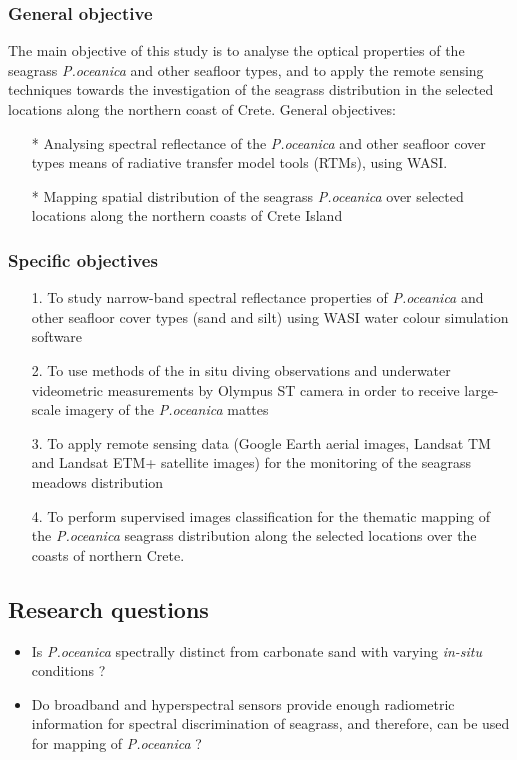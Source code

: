\documentclass[11pt]{article}
\begin{document}
\subsubsection{General objective}
The main objective of this study is to analyse the optical properties of the seagrass \textit{P.oceanica} and other seafloor types, and to apply the remote sensing techniques towards the investigation of the seagrass distribution in the selected locations along the northern coast of Crete.
General objectives:
	\begin{itemize}
		\item[*]Analysing spectral reflectance of the \textit{P.oceanica} and other seafloor cover types means of radiative transfer model tools (\ac{RTM}s), using \ac{WASI}.
		\item[*]Mapping spatial distribution of the seagrass \textit{P.oceanica} over selected locations along the northern coasts of Crete Island 
	\end{itemize}

\subsubsection{Specific objectives}
	\begin{itemize}	
		\item[]1.	To study narrow-band spectral reflectance properties of \textit{P.oceanica} and other seafloor cover types (sand and silt) using \ac{WASI} water colour simulation software 
		\item[]2.	To use methods of the in situ diving observations and underwater videometric measurements by \ac{Olympus ST} camera in order to receive large-scale imagery of the \textit{P.oceanica} mattes 
		\item[]3.	To apply remote sensing data (Google Earth aerial images, \ac{Landsat TM} and \ac{Landsat ETM+} satellite images) for the monitoring of the seagrass meadows distribution 
		\item[]4.	To perform supervised images classification for the thematic mapping of the \textit{P.oceanica} seagrass distribution along the selected locations over the coasts of northern Crete. 
	\end{itemize}
\pagebreak

\subsection{Research questions}
	\begin{itemize}	
		\item Is \textit{P.oceanica} spectrally distinct from carbonate sand with varying \textit{in-situ} conditions ?
		\item Do broadband and hyperspectral sensors provide enough radiometric information for spectral discrimination of seagrass, and therefore, can be used for mapping of \textit{P.oceanica} ?
	\end{itemize}
\end{document}
